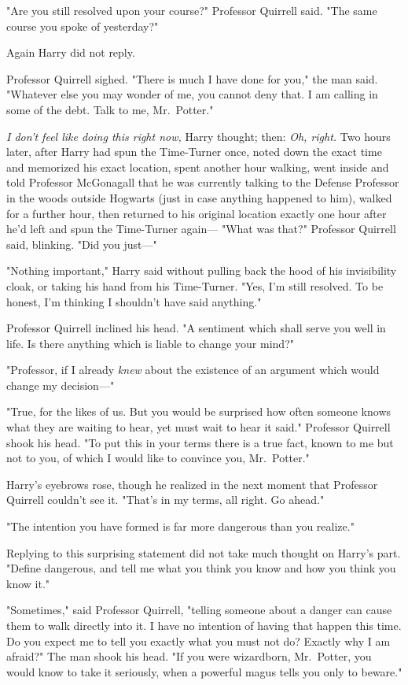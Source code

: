 "Are you still resolved upon your course?" Professor Quirrell said. "The same
course you spoke of yesterday?"

Again Harry did not reply.

Professor Quirrell sighed. "There is much I have done for you," the man said.
"Whatever else you may wonder of me, you cannot deny that. I am calling in some
of the debt. Talk to me, Mr.~Potter."

\emph{I don't feel like doing this right now,} Harry thought; then: \emph{Oh,
right.}
\sbreak
Two hours later, after Harry had spun the Time-Turner once, noted down the
exact time and memorized his exact location, spent another hour walking, went
inside and told Professor McGonagall that he was currently talking to the
Defense Professor in the woods outside Hogwarts (just in case anything happened
to him), walked for a further hour, then returned to his original location
exactly one hour after he'd left and spun the Time-Turner again---
\sbreak
"What was that?" Professor Quirrell said, blinking. "Did you just---"

"Nothing important," Harry said without pulling back the hood of his
invisibility cloak, or taking his hand from his Time-Turner. "Yes, I'm still
resolved. To be honest, I'm thinking I shouldn't have said anything."

Professor Quirrell inclined his head. "A sentiment which shall serve you well
in life. Is there anything which is liable to change your mind?"

"Professor, if I already \emph{knew} about the existence of an argument which
would change my decision---"

"True, for the likes of us. But you would be surprised how often someone knows
what they are waiting to hear, yet must wait to hear it said." Professor
Quirrell shook his head. "To put this in your terms{\el} there is a true
fact, known to me but not to you, of which I would like to convince you,
Mr.~Potter."

Harry's eyebrows rose, though he realized in the next moment that Professor
Quirrell couldn't see it. "That's in my terms, all right. Go ahead."

"The intention you have formed is far more dangerous than you realize."

Replying to this surprising statement did not take much thought on Harry's
part. "Define dangerous, and tell me what you think you know and how you think
you know it."

"Sometimes," said Professor Quirrell, "telling someone about a danger can cause
them to walk directly into it. I have no intention of having that happen this
time. Do you expect me to tell you exactly what you must not do? Exactly why I
am afraid?" The man shook his head. "If you were wizardborn, Mr.~Potter, you
would know to take it seriously, when a powerful magus tells you only to
beware."


